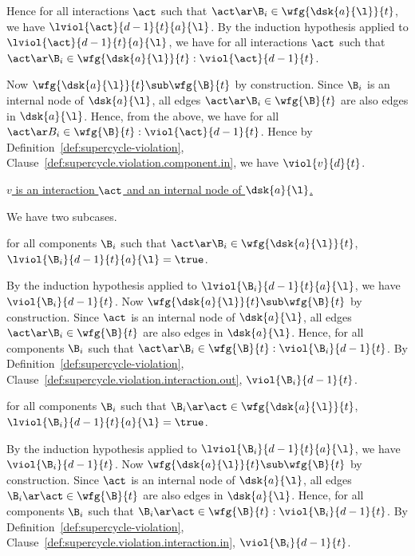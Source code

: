 {Hence for all interactions $\act$ such that $\act \ar \B_i \in \wfg{\dsk{a}{\l}}{t}$, we have $\lviol{\act}{d-1}{t}{a}{\l}$.
By the induction hypothesis applied to $\lviol{\act}{d-1}{t}{a}{\l}$, we have 
for all interactions $\act$ such that $\act \ar \B_i \in \wfg{\dsk{a}{\l}}{t}: \viol{\act}{d-1}{t}$.

Now $\wfg{\dsk{a}{\l}}{t} \sub \wfg{\B}{t}$ by construction. Since $\B_i$ is an internal node of $\dsk{a}{\l}$, 
all edges $\act \ar \B_i \in \wfg{\B}{t}$ are also edges in $\dsk{a}{\l}$. Hence, from the above, we have
for all $\act \ar B_i \in \wfg{\B}{t} : \viol{\act}{d-1}{t}$.
Hence by Definition~\ref{def:supercycle-violation}, Clause~\ref{def:supercycle.violation.component.in}, 
we have $\viol{v}{d}{t}$.

   \ee


\item \ul{$v$ is an interaction $\act$ and an internal node of $\dsk{a}{\l}$.}

We have two subcases.
   \be

   \item for all components $\B_i$ such that $\act \ar \B_i \in \wfg{\dsk{a}{\l}}{t}$, $\lviol{\B_i}{d-1}{t}{a}{\l} = \true$.

By the induction hypothesis applied to $\lviol{\B_i}{d-1}{t}{a}{\l}$, we have $\viol{\B_i}{d-1}{t}$. 
Now $\wfg{\dsk{a}{\l}}{t} \sub \wfg{\B}{t}$ by construction.
Since $\act$ is an internal node of $\dsk{a}{\l}$,
all edges $\act \ar \B_i \in \wfg{\B}{t}$ are also edges in $\dsk{a}{\l}$.
Hence, for all components $\B_i$ such that $\act \ar \B_i \in \wfg{\B}{t}: \viol{\B_i}{d-1}{t}$.
By Definition~\ref{def:supercycle-violation}, Clause~\ref{def:supercycle.violation.interaction.out}, 
$\viol{\B_i}{d-1}{t}$.

   \item for all components $\B_i$ such that $\B_i \ar \act \in \wfg{\dsk{a}{\l}}{t}$, $\lviol{\B_i}{d-1}{t}{a}{\l} = \true$.

By the induction hypothesis applied to $\lviol{\B_i}{d-1}{t}{a}{\l}$, we have $\viol{\B_i}{d-1}{t}$. 
Now $\wfg{\dsk{a}{\l}}{t} \sub \wfg{\B}{t}$ by construction.
Since $\act$ is an internal node of $\dsk{a}{\l}$,
all edges $\B_i \ar \act \in \wfg{\B}{t}$ are also edges in $\dsk{a}{\l}$.
Hence, for all components $\B_i$ such that $\B_i \ar \act \in \wfg{\B}{t}: \viol{\B_i}{d-1}{t}$.
By Definition~\ref{def:supercycle-violation}, Clause~\ref{def:supercycle.violation.interaction.in}, 
$\viol{\B_i}{d-1}{t}$.

   \ee

\ee
}




